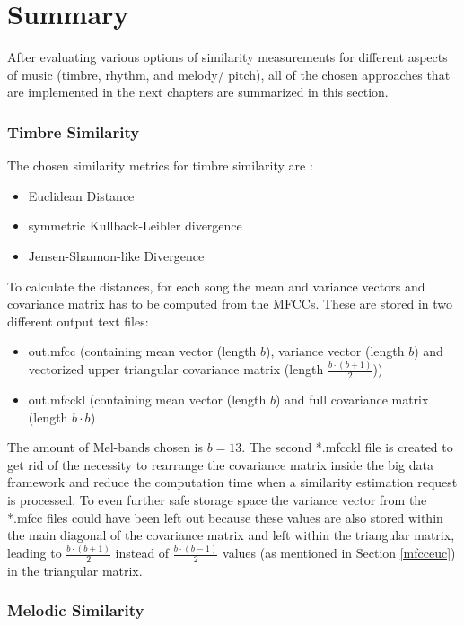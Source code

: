 \section{Summary}\label{sumfeat}

After evaluating various options of similarity measurements for different aspects of music (timbre, rhythm, and melody/ pitch), all of the chosen approaches that are implemented in the next chapters are summarized in this section. 

\subsubsection{Timbre Similarity}

The chosen similarity metrics for timbre similarity are : 
\begin{itemize}
	\setlength\itemsep{-0.5em}
	\item Euclidean Distance
	\item symmetric Kullback-Leibler divergence
	\item Jensen-Shannon-like Divergence
\end{itemize}
To calculate the distances, for each song the mean and variance vectors and covariance matrix has to be computed from the MFCCs. These are stored in two different output text files: 
\begin{itemize}
	\setlength\itemsep{-0.5em}
	\item out.mfcc (containing mean vector (length $b$), variance vector (length $b$) and vectorized upper triangular covariance matrix (length $\frac{b \cdot (b+1)}{2}$))
	\item out.mfcckl (containing mean vector (length $b$) and full covariance matrix (length $b \cdot b$)
\end{itemize}
The amount of Mel-bands chosen is $b = 13$. The second *.mfcckl file is created to get rid of the necessity to rearrange the covariance matrix inside the big data framework and reduce the computation time when a similarity estimation request is processed. To even further safe storage space the variance vector from the *.mfcc files could have been left out because these values are also stored within the main diagonal of the covariance matrix and left within the triangular matrix, leading to $\frac{b \cdot (b+1)}{2}$ instead of $\frac{b \cdot (b-1)}{2}$ values (as mentioned in Section \ref{mfcceuc}) in the triangular matrix.\\

\subsubsection{Melodic Similarity}


